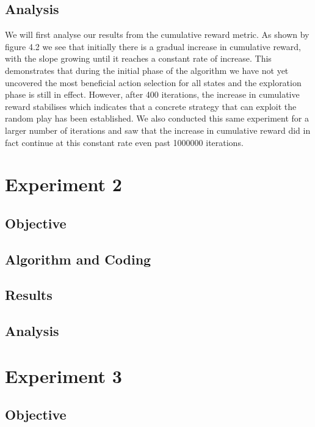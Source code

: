 \subsection{Analysis}\label{subsec:analysis1}
We will first analyse our results from the cumulative reward metric.
As shown by figure 4.2 we see that initially there is a gradual increase in cumulative reward,
with the slope growing until it reaches a constant rate of increase.
This demonstrates that during the initial phase of the algorithm we have not yet uncovered
the most beneficial action selection for all states and the exploration phase is still in effect.
However, after 400 iterations, the increase in cumulative reward stabilises which indicates
that a concrete strategy that can exploit the random play has been established.
We also conducted this same experiment for a larger number of iterations and saw that the increase
in cumulative reward did in fact continue at this constant rate even past 1000000 iterations.

\section{Experiment 2} \label{sec:experiment2}

\subsection{Objective}\label{subsec:objective2}
\subsection{Algorithm and Coding}\label{subsec:algAndCoding2}
\subsection{Results}\label{subsec:results2}
\subsection{Analysis}\label{subsec:analysis2}

\section{Experiment 3}\label{sec:experiment3}

\subsection{Objective}\label{subsec:objective3}
